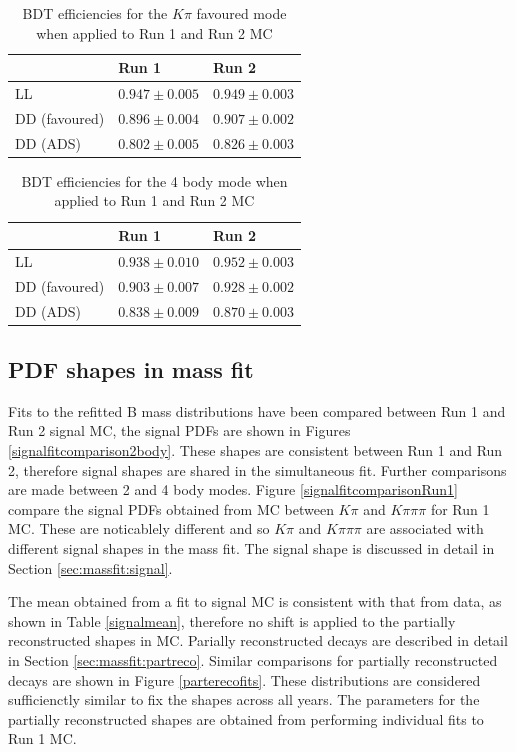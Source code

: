 \begin{table}[h]
\centering
\begin{tabular}{lll}
\hline
& Run 1 & Run 2 \\
\hline
LL & $0.947 \pm 0.005 $ & $0.949 \pm 0.003$ \\
DD (favoured) & $0.896 \pm 0.004$ & $0.907 \pm 0.002$ \\
DD (ADS) & $0.802 \pm 0.005$ & $0.826 \pm 0.003$ \\
\hline
\end{tabular}
\caption{BDT efficiencies for the $K\pi$ favoured mode when applied to Run 1 and Run 2 MC}
\label{bdtefficiencies2body}
\end{table}

\begin{table}[h]
\centering
\begin{tabular}{lll}
\hline
& Run 1 & Run 2 \\
\hline
LL & $0.938 \pm 0.010 $ & $0.952 \pm 0.003$ \\
DD (favoured) & $0.903 \pm 0.007$ & $0.928 \pm 0.002$ \\
DD (ADS) & $0.838 \pm 0.009$ & $0.870 \pm 0.003$ \\
\hline
\end{tabular}
\caption{BDT efficiencies for the 4 body mode when applied to Run 1 and Run 2 MC}
\label{bdtefficiencies4body}
\end{table}

\subsection{PDF shapes in mass fit}
\label{sec:mc:pdfshapes}

Fits to the refitted B mass distributions have been compared between Run 1 and Run 2 signal MC, the signal PDFs are shown in Figures \ref{signalfitcomparison2body}. These shapes are consistent between Run 1 and Run 2, therefore signal shapes are shared in the simultaneous fit. Further comparisons are made between 2 and 4 body modes. Figure \ref{signalfitcomparisonRun1} compare the signal PDFs obtained from MC between $K\pi$ and $K\pi\pi\pi$ for Run 1 MC. These are noticablely different and so $K\pi$ and $K\pi\pi\pi$ are associated with different signal shapes in the mass fit. The signal shape is discussed in detail in Section \ref{sec:massfit:signal}.

The mean obtained from a fit to signal MC is consistent with that from data, as shown in Table \ref{signalmean}, therefore no shift is applied to the partially reconstructed shapes in MC. Parially reconstructed decays are described in detail in Section \ref{sec:massfit:partreco}. Similar comparisons for partially reconstructed decays are shown in Figure \ref{parterecofits}. These distributions are considered sufficienctly similar to fix the shapes across all years. The parameters for the partially reconstructed shapes are obtained from performing individual fits to Run 1 MC.

